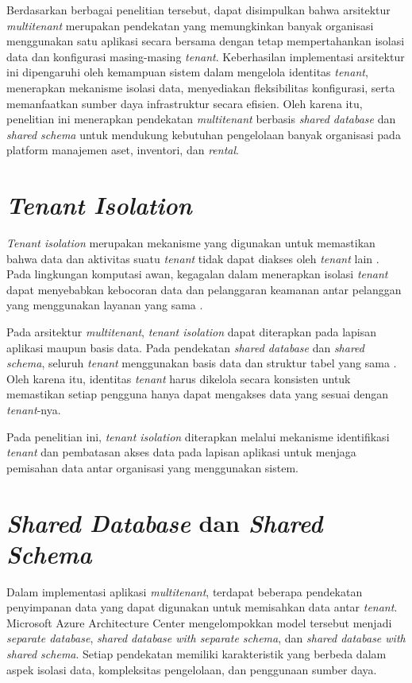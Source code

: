 Berdasarkan berbagai penelitian tersebut, dapat disimpulkan bahwa arsitektur \textit{multitenant} merupakan pendekatan yang memungkinkan banyak organisasi menggunakan satu aplikasi secara bersama dengan tetap mempertahankan isolasi data dan konfigurasi masing-masing \textit{tenant}. Keberhasilan implementasi arsitektur ini dipengaruhi oleh kemampuan sistem dalam mengelola identitas \textit{tenant}, menerapkan mekanisme isolasi data, menyediakan fleksibilitas konfigurasi, serta memanfaatkan sumber daya infrastruktur secara efisien. Oleh karena itu, penelitian ini menerapkan pendekatan \textit{multitenant} berbasis \textit{shared database} dan \textit{shared schema} untuk mendukung kebutuhan pengelolaan banyak organisasi pada platform manajemen aset, inventori, dan \textit{rental}.

\section{\textit{Tenant Isolation}}

\textit{Tenant isolation} merupakan mekanisme yang digunakan untuk memastikan bahwa data dan aktivitas suatu \textit{tenant} tidak dapat diakses oleh \textit{tenant} lain \cite{ref4}. Pada lingkungan komputasi awan, kegagalan dalam menerapkan isolasi \textit{tenant} dapat menyebabkan kebocoran data dan pelanggaran keamanan antar pelanggan yang menggunakan layanan yang sama \cite{ref11}.

Pada arsitektur \textit{multitenant}, \textit{tenant isolation} dapat diterapkan pada lapisan aplikasi maupun basis data. Pada pendekatan \textit{shared database} dan \textit{shared schema}, seluruh \textit{tenant} menggunakan basis data dan struktur tabel yang sama \cite{ref6,ref9}. Oleh karena itu, identitas \textit{tenant} harus dikelola secara konsisten untuk memastikan setiap pengguna hanya dapat mengakses data yang sesuai dengan \textit{tenant}-nya.

Pada penelitian ini, \textit{tenant isolation} diterapkan melalui mekanisme identifikasi \textit{tenant} dan pembatasan akses data pada lapisan aplikasi untuk menjaga pemisahan data antar organisasi yang menggunakan sistem.

\section{\textit{Shared Database} dan \textit{Shared Schema}}

Dalam implementasi aplikasi \textit{multitenant}, terdapat beberapa pendekatan penyimpanan data yang dapat digunakan untuk memisahkan data antar \textit{tenant}. Microsoft Azure Architecture Center \cite{ref7} mengelompokkan model tersebut menjadi \textit{separate database}, \textit{shared database with separate schema}, dan \textit{shared database with shared schema}. Setiap pendekatan memiliki karakteristik yang berbeda dalam aspek isolasi data, kompleksitas pengelolaan, dan penggunaan sumber daya.

